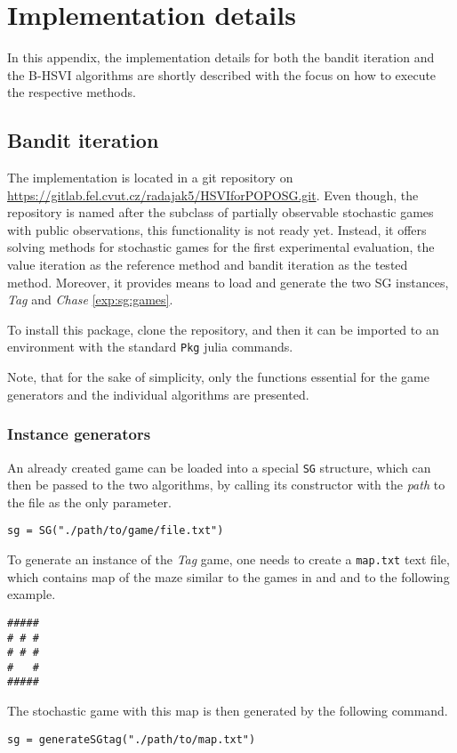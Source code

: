 \documentclass[../main.tex]{subfiles}
\begin{document}
\chapter{Implementation details}\label{apx:impl}
In this appendix, the implementation details for both the bandit iteration and the B-HSVI algorithms are shortly described with the focus on how to execute the respective methods.

\section{Bandit iteration}
The implementation is located in a git repository on \url{https://gitlab.fel.cvut.cz/radajak5/HSVIforPOPOSG.git}.
Even though, the repository is named after the subclass of partially observable stochastic games with public observations, this functionality is not ready yet.
Instead, it offers solving methods for stochastic games for the first experimental evaluation, the value iteration  as the reference method and bandit iteration  as the tested method.
Moreover, it provides means to load and generate the two SG instances, \textit{Tag} and \textit{Chase} \ref{exp:sg:games}.

To install this package, clone the repository, and then it can be imported to an environment with the standard \texttt{Pkg} julia commands.

Note, that for the sake of simplicity, only the functions essential for the game generators and the individual algorithms are presented.

\subsection{Instance generators}
An already created game can be loaded into a special \texttt{SG} structure, which can then be passed to the two algorithms, by calling its constructor with the \textit{path} to the file as the only parameter.
\begin{lstlisting}
sg = SG("./path/to/game/file.txt")
\end{lstlisting}

To generate an instance of the \textit{Tag} game, one needs to create a \texttt{map.txt} text file, which contains map of the maze similar to the games in  and  and to the following example.
\begin{lstlisting}
#####
# # #
# # #
#   #
#####
\end{lstlisting}
The stochastic game with this map is then generated by the following command.
\begin{lstlisting}
sg = generateSGtag("./path/to/map.txt")
\end{lstlisting}
\end{document}
